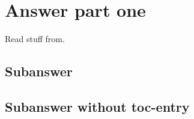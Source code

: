\section{Answer part one}

Read stuff from\cite{Larson2021}.

\subsection{Subanswer}

\subsection*{Subanswer without toc-entry}